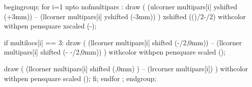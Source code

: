begingroup;                                     %
  for i=1 upto nofmultipars   :    %
    draw ( (ulcorner multipars[i] yshifted (+3mm)) --
           (llcorner multipars[i] yshifted (-3mm)) )
         xshifted (()/2-/2) 
         withcolor 
         withpen pensquare
         xscaled (-);        %
   
    if multilocs[i] == 3:                   %
         draw ( (llcorner multipars[i]           %
                 shifted (-/2,0mm)) --
                (llcorner multipars[i] 
                 shifted (-
                         -/2,0mm)) )
         withcolor 
         withpen pensquare scaled ();

         draw ( (llcorner multipars[i] shifted (,0mm) ) --
                (lrcorner multipars[i]) )
         withcolor 
         withpen pensquare scaled (); 
    fi;
  endfor ;
endgroup;
\stopuseMPgraphic


\stopenvironment
